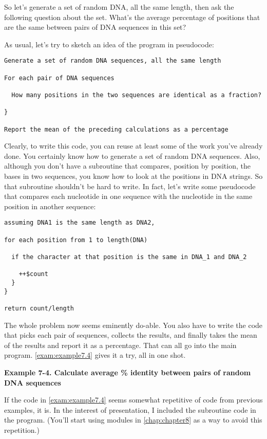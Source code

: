 So let's generate a set of random DNA, all the same length, then ask the following question about the set. What's the average percentage of positions that are the same between pairs of DNA sequences in this set?

As usual, let's try to sketch an idea of the program in pseudocode: 

\begin{lstlisting}
Generate a set of random DNA sequences, all the same length

For each pair of DNA sequences

  How many positions in the two sequences are identical as a fraction?

}

Report the mean of the preceding calculations as a percentage
\end{lstlisting}

Clearly, to write this code, you can reuse at least some of the work you've already done. You certainly know how to generate a set of random DNA sequences. Also, although you don't have a subroutine that compares, position by position, the bases in two sequences, you know how to look at the positions in DNA strings. So that subroutine shouldn't be hard to write. In fact, let's write some pseudocode that compares each nucleotide in one sequence with the nucleotide in the same position in another sequence: 

\begin{lstlisting}
assuming DNA1 is the same length as DNA2,

for each position from 1 to length(DNA)

  if the character at that position is the same in DNA_1 and DNA_2

    ++$count
  }
}

return count/length
\end{lstlisting}

The whole problem now seems eminently do-able. You also have to write the code that picks each pair of sequences, collects the results, and finally takes the mean of the results and report it as a percentage.  That can all go into the main program. \autoref{exam:example7.4} gives it a try, all in one shot. 

\textbf{Example 7-4. Calculate average \% identity between pairs of random DNA sequences}


If the code in \autoref{exam:example7.4} seems somewhat repetitive of code from previous examples, it is. In the interest of presentation, I included the subroutine code in the program. (You'll start using modules in \autoref{chap:chapter8} as a way to avoid this repetition.) 

